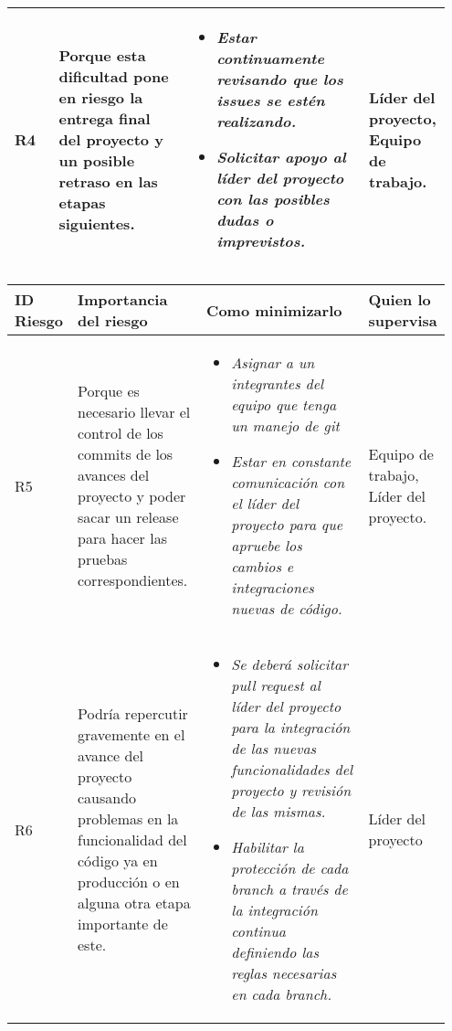 \documentclass[12pt,a4paper]{article}
\begin{document}
\begin{table}[h!]
\begin{tabular}{|p{0.10\linewidth}|p{0.30\linewidth}|p{0.40\linewidth}|p{0.15\linewidth}|}
R4&Porque esta dificultad pone en riesgo la entrega final del proyecto y un posible retraso en las etapas siguientes.&\begin{itemize}
\item \textit{Estar continuamente revisando que los issues se estén realizando.}
\item \textit{Solicitar apoyo al líder del proyecto con las posibles dudas o imprevistos.}
\end{itemize}
&Líder del proyecto, Equipo de trabajo.\\\hline
\end{tabular}
\end{table}

\newpage

\begin{table}[h!]
\begin{tabular}{|p{0.10\linewidth}|p{0.30\linewidth}|p{0.40\linewidth}|p{0.15\linewidth}|}
\hline
\textbf{ID Riesgo}&\textbf{Importancia del riesgo}&\textbf{Como minimizarlo}&\textbf{Quien lo supervisa}
\\\hline

R5&Porque es necesario llevar el control de los commits de los avances del proyecto y poder sacar un release para hacer las pruebas correspondientes.&\begin{itemize}
\item \textit{Asignar a un integrantes del equipo que tenga un manejo de git}
\item \textit{Estar en constante comunicación con el líder del proyecto para que apruebe los cambios e integraciones nuevas de código.}
\end{itemize}&Equipo de trabajo, Líder del proyecto.\\\hline

R6&Podría repercutir gravemente en el avance del proyecto causando problemas en la funcionalidad del código ya en producción o en alguna otra etapa importante de este.&\begin{itemize}
\item \textit{Se deberá solicitar pull request al líder del proyecto para la integración de las nuevas funcionalidades del proyecto y revisión de las mismas.}
\item \textit{Habilitar la protección de cada branch a través de la integración continua definiendo las reglas necesarias en cada branch.}
\end{itemize} 
&Líder del proyecto\\\hline


\end{tabular}
\end{table}
\end{document}
